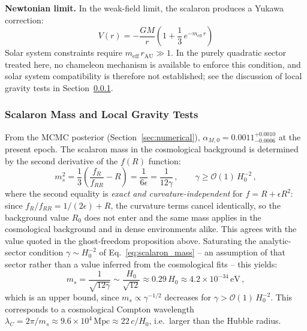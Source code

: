 \documentclass[aps,prd,twocolumn,superscriptaddress,nofootinbib]{revtex4-2}
\begin{document}
\textbf{Newtonian limit.} In the weak-field limit, the scalaron produces a Yukawa correction:
\begin{equation}
V(r) = -\frac{GM}{r}\left(1 + \frac{1}{3}\,e^{-m_{\mathrm{eff}}\,r}\right)
\label{eq:yukawa}
\end{equation}
Solar system constraints require $m_{\mathrm{eff}}\,r_{\mathrm{AU}} \gg 1$. In the purely quadratic sector treated here, no chameleon mechanism is available to enforce this condition, and solar system compatibility is therefore not established; see the discussion of local gravity tests in Section~\ref{subsubsec:scalaron_mass}.

\subsubsection{Scalaron Mass and Local Gravity Tests}
\label{subsubsec:scalaron_mass}

From the MCMC posterior (Section~\ref{sec:numerical}), $\alpha_{M,0} = 0.0011^{+0.0010}_{-0.0006}$ at the present epoch. The scalaron mass in the cosmological background is determined by the second derivative of the $f(R)$ function:
\begin{equation}
m_s^2 = \frac{1}{3}\left(\frac{f_R}{f_{RR}} - R\right) = \frac{1}{6\epsilon} = \frac{1}{12\gamma}\,, \qquad \gamma \geq \mathcal{O}(1)\,H_0^{-2}\,,
\label{eq:scalaron_mass}
\end{equation}
where the second equality is \textit{exact and curvature-independent} for $f = R + \epsilon R^2$: since $f_R/f_{RR} = 1/(2\epsilon) + R$, the curvature terms cancel identically, so the background value $R_0$ does not enter and the same mass applies in the cosmological background and in dense environments alike. This agrees with the value quoted in the ghost-freedom proposition above. Saturating the analytic-sector condition $\gamma \sim H_0^{-2}$ of Eq.~\eqref{eq:scalaron_mass} -- an assumption of that sector rather than a value inferred from the cosmological fits -- this yields:
\begin{equation}
m_s = \frac{1}{\sqrt{12\gamma}} \sim \frac{H_0}{\sqrt{12}} \approx 0.29\,H_0 \approx 4.2 \times 10^{-34}\,\mathrm{eV}\,,
\end{equation}
which is an upper bound, since $m_s \propto \gamma^{-1/2}$ decreases for $\gamma > \mathcal{O}(1)\,H_0^{-2}$. This corresponds to a cosmological Compton wavelength $\lambda_C = 2\pi/m_s \approx 9.6 \times 10^{4}\,\mathrm{Mpc} \approx 22\,c/H_0$, i.e.\ larger than the Hubble radius.
\end{document}
